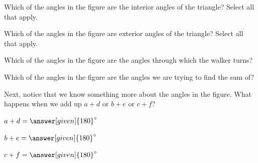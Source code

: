 \documentclass{ximera}
\begin{document}
\begin{explanation}
Which of the angles in the figure are the interior angles of the triangle? Select all that apply.
\begin{selectAll}
\end{selectAll}
Which of the angles in the figure are exterior angles of the triangle? Select all that apply.
\begin{selectAll}
\end{selectAll}
Which of the angles in the figure are the angles through which the walker turns?
\begin{multipleChoice}
\end{multipleChoice}

Which of the angles in the figure are the angles we are trying to find the sum of?
\begin{multipleChoice}
\end{multipleChoice}


Next, notice that we know something more about the angles in the figure.
What happens when we add up $a+d$ or $b+e$ or $c+f$?

\begin{prompt}
 $a+d = \answer[given]{180}^{\circ}$
 
  $b+e = \answer[given]{180}^{\circ}$
  
   $c+f = \answer[given]{180}^{\circ}$
\end{prompt}


\end{explanation}
\end{document}
